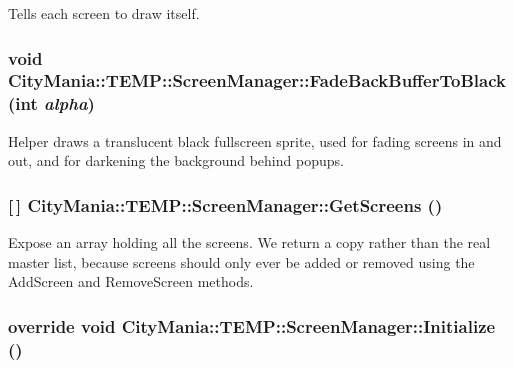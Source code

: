 Tells each screen to draw itself. \hypertarget{classCityMania_1_1TEMP_1_1ScreenManager_abd1ee6fbaabfdb5a8363c4df60550aa4}{
\subsubsection[{FadeBackBufferToBlack}]{\setlength{\rightskip}{0pt plus 5cm}void CityMania::TEMP::ScreenManager::FadeBackBufferToBlack (int {\em alpha})}}
\label{classCityMania_1_1TEMP_1_1ScreenManager_abd1ee6fbaabfdb5a8363c4df60550aa4}


Helper draws a translucent black fullscreen sprite, used for fading screens in and out, and for darkening the background behind popups. \hypertarget{classCityMania_1_1TEMP_1_1ScreenManager_a5592ebdeeb6968d4b45faf7fa905c9a8}{
\subsubsection[{GetScreens}]{ \mbox{[}$\,$\mbox{]} CityMania::TEMP::ScreenManager::GetScreens ()}}
\label{classCityMania_1_1TEMP_1_1ScreenManager_a5592ebdeeb6968d4b45faf7fa905c9a8}


Expose an array holding all the screens. We return a copy rather than the real master list, because screens should only ever be added or removed using the AddScreen and RemoveScreen methods. \hypertarget{classCityMania_1_1TEMP_1_1ScreenManager_a066e176e641ea365b4d20798d0588296}{
\subsubsection[{Initialize}]{\setlength{\rightskip}{0pt plus 5cm}override void CityMania::TEMP::ScreenManager::Initialize ()}}
\label{classCityMania_1_1TEMP_1_1ScreenManager_a066e176e641ea365b4d20798d0588296}


